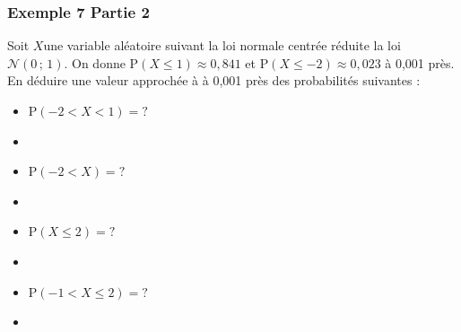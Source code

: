 \documentclass[xcolor=svgnames,t,final]{beamer}
\begin{document}
\begin{frame}
\frametitle{Exemple 7 Partie 2}
\label{exemple7}

Soit  $X $une variable aléatoire suivant la loi normale centrée réduite la loi $\mathcal{N}\left(0 \, ; \, 1\right)$. On donne $\text{P}\left( X \leqslant 1 \right) \approx 0,841$  et  $\text{P}\left( X \leqslant -2 \right) \approx 0,023$ à 0,001 près. En déduire une valeur approchée à à 0,001 près des probabilités suivantes :

\begin{itemize}

\item $\text{P}\left( -2<X<1 \right)=?$
\pause \item
\item $\text{P}\left( -2<X \right)=?$
\pause \item
\item $\text{P}\left( X \leqslant 2 \right)=?$
\pause \item
\item $\text{P}\left(-1 < X \leqslant 2 \right)=?$
\pause \item
\end{itemize}


\end{frame}
\end{document}
